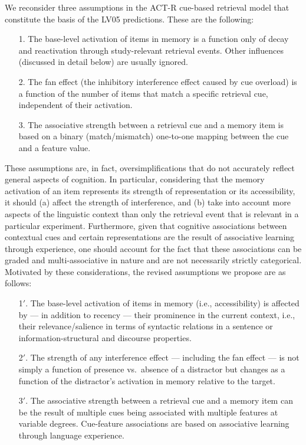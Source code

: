 \documentclass{cambridge7A}\usepackage[]{graphicx}\usepackage[]{color}
\begin{document}
We reconsider three assumptions in the ACT-R cue-based retrieval model that constitute the basis of the LV05 predictions. These are the following:

\begin{enumerate}
  \item[1.] The base-level activation of items in memory is a function only of decay and reactivation through study-relevant retrieval events. Other influences (discussed in detail below) are usually ignored.
  \item[2.] The fan effect (the inhibitory interference effect caused by cue overload) is a function of the number of items that match a specific retrieval cue, independent of their activation.
  \item[3.] The associative strength between a retrieval cue and a memory item is based on a binary (match/mismatch) one-to-one mapping between the cue and a feature value.
\end{enumerate}

These assumptions are, in fact, oversimplifications that do not accurately reflect general aspects of cognition. 
In particular, considering that the memory activation of an item represents its strength of representation or its accessibility, it should (a) affect the strength of interference, and (b) take into account more aspects of the linguistic context than only the retrieval event that is relevant in a particular experiment. 
Furthermore, given that cognitive associations between contextual cues and certain representations are the result of associative learning through experience, 
one should account for the fact that these associations can be graded and multi-associative in nature and are not necessarily strictly categorical.
Motivated by these considerations, the revised assumptions we propose are as follows:

\begin{enumerate}
  \item[1$'$.] The base-level activation of items in memory (i.e., accessibility) is affected by --- in addition to recency --- their  prominence in the current context, i.e., their  relevance/salience in terms of syntactic relations in a sentence or information-structural and discourse properties.
  \item[2$'$.] The strength of any interference effect --- including the fan effect --- is not simply a function of presence vs.\ absence of a distractor but changes as a function of the distractor's activation in memory relative to the target.
  \item[3$'$.] The associative strength between a retrieval cue and a memory item can be the result of multiple cues being associated with multiple features at variable degrees.   Cue-feature associations are based on associative learning through language experience. 
\end{enumerate}
\end{document}
